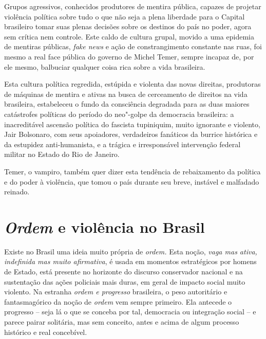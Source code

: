 Grupos agressivos, conhecidos produtores de mentira pública, capazes de
projetar violência política sobre tudo o que não seja a plena liberdade
para o Capital brasileiro tomar suas plenas decisões sobre os destinos
do país no poder, agora sem crítica nem controle. Este caldo de cultura
grupal, movido a uma epidemia de mentiras públicas, \emph{fake news} e
ação de constrangimento constante nas ruas, foi mesmo a real face
pública do governo de Michel Temer, sempre incapaz de, por ele mesmo,
balbuciar qualquer coisa rica sobre a vida brasileira.

Esta cultura política regredida, estúpida e violenta das novas
direitas, produtoras de máquinas de mentira e ativas
na busca de cerceamento de direitos na vida brasileira, estabeleceu o
fundo da consciência degradada para as duas maiores catástrofes
políticas do período do neo"-golpe da democracia brasileira: a
inacreditável ascensão política do fascista tupiniquim, muito ignorante
e violento, Jair Bolsonaro, com seus apoiadores, verdadeiros fanáticos
da burrice histórica e da estupidez anti-humanista, e a trágica e irresponsável intervenção
federal militar no Estado do Rio de Janeiro.

Temer, o vampiro, também quer dizer esta tendência de rebaixamento da
política e do poder à violência, que tomou o país durante seu breve,
instável e malfadado reinado.

\chapter{\emph{Ordem} e violência no Brasil}

Existe no Brasil uma ideia muito própria de \emph{ordem.} Esta
noção, \emph{vaga mas ativa, indefinida mas muito afirmativa}, é usada
em momentos estratégicos por homens de Estado, está presente no
horizonte do discurso conservador nacional e na sustentação das ações
policiais mais duras, em geral de impacto social muito violento. Na
estranha \emph{ordem e progresso} brasileira, o peso autoritário e
fantasmagórico da noção de \emph{ordem} vem sempre primeiro. Ela
antecede o progresso -- seja lá o que se conceba por tal, democracia ou
integração social -- e parece pairar solitária, mas sem conceito, antes
e acima de algum processo histórico e real concebível.

